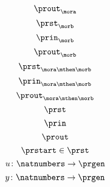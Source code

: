 {\begin{forslides}
        \begin{equation}
            \label{eq:mora-prout}
            \prout_{\mora}
        \end{equation}
        \begin{equation}
            \label{eq:morb-prst}
            \prst_{\morb}
        \end{equation}
        \begin{equation}
            \label{eq:morb-prin}
            \prin_{\morb}
        \end{equation}
        \begin{equation}
            \label{eq:morb-prout}
            \prout_{\morb}
        \end{equation}
        \begin{equation}
            \label{eq:morab-prst}
            \prst_{\mora\mthen\morb}
        \end{equation}
        \begin{equation}
            \label{eq:morab-prin}
            \prin_{\mora\mthen\morb}
        \end{equation}
        \begin{equation}
            \label{eq:morab-prout}
            \prout_{\mora\mthen\morb}
        \end{equation}
        \begin{equation}
            \label{eq:gen-prst}
            \prst
        \end{equation}
        \begin{equation}
            \label{eq:gen-prin}
            \prin
        \end{equation}
        \begin{equation}
            \label{eq:gen-prout}
            \prout
        \end{equation}
        \begin{equation}
            \label{eq:moore-start}
            \prstart \in \prst
        \end{equation}
        \begin{equation}
            \label{eq:prgen-u}
            u\colon \natnumbers \to \prgen
        \end{equation}
        \begin{equation}
            \label{eq:prgen-y}
            y\colon \natnumbers \to \prgen
        \end{equation}

\end{forslides}}
